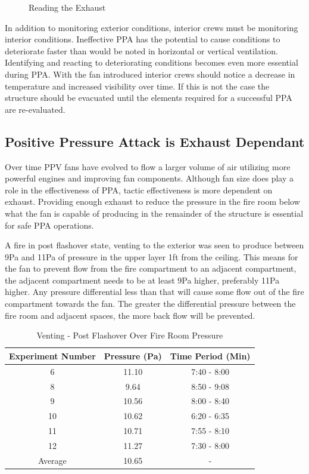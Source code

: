 \documentclass{article}
\begin{document}
\begin{figure}[H]
\begin{tabular}{c c c}
	\end{tabular}
	\caption{Reading the Exhaust}
	\label{fig:ReadExhaust}
\end{figure}

In addition to monitoring exterior conditions, interior crews must be monitoring interior conditions. Ineffective PPA has the potential to cause conditions to deteriorate faster than would be noted in horizontal or vertical ventilation. Identifying and reacting to deteriorating conditions becomes even more essential during PPA. With the fan introduced interior crews should notice a decrease in temperature and increased visibility over time. If this is not the case the structure should be evacuated until the elements required for a successful PPA are re-evaluated.

\subsection{Positive Pressure Attack is Exhaust Dependant} \label{sec:ExhaustDepend}

Over time PPV fans have evolved to flow a larger volume of air utilizing more powerful engines and improving fan components. Although fan size does play a role in the effectiveness of PPA, tactic effectiveness is more dependent on exhaust. Providing enough exhaust to reduce the pressure in the fire room below what the fan is capable of producing in the remainder of the structure is essential for safe PPA operations.

A fire in post flashover state, venting to the exterior was seen to produce between 9Pa and 11Pa of pressure in the upper layer 1ft from the ceiling. This means for the fan to prevent flow from the fire compartment to an adjacent compartment, the adjacent compartment needs to be at least 9Pa higher, preferably 11Pa higher. Any pressure differential less than that will cause some flow out of the fire compartment towards the fan. The greater the differential pressure between the fire room and adjacent spaces, the more back
flow will be prevented.

\begin{table} [H]
	\centering
	\caption{Venting - Post Flashover Over Fire Room Pressure}
	\begin{tabular}{|c|c|c|}
		\hline
		Experiment Number & Pressure (Pa) & Time Period (Min) \\ \hline \hline
		6 & 11.10 & 7:40 - 8:00 \\ \hline
		8 & 9.64 & 8:50 - 9:08 \\ \hline
		9 & 10.56 & 8:00 - 8:40 \\ \hline
		10 & 10.62 & 6:20 - 6:35 \\ \hline
		11 & 10.71 & 7:55 - 8:10 \\ \hline
		12 & 11.27 & 7:30 - 8:00 \\ \hline
		Average & 10.65 & -  \\ \hline
	\end{tabular}
	\label{tab:FireRoomPressure}
\end{table}
\end{document}
